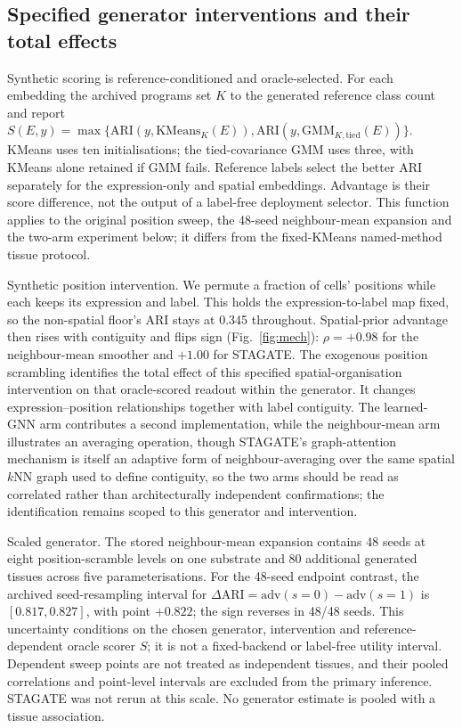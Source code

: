 \documentclass[journal]{IEEEtran}
\begin{document}
\subsection{Specified generator interventions and their total effects}\label{sec:causal}


Synthetic scoring is reference-conditioned and oracle-selected. For each embedding the archived programs set $K$ to the generated reference class count and report $S(E,y)=\max\{\mathrm{ARI}(y,\mathrm{KMeans}_K(E)),\mathrm{ARI}(y,\mathrm{GMM}_{K,\mathrm{tied}}(E))\}$. KMeans uses ten initialisations; the tied-covariance GMM uses three, with KMeans alone retained if GMM fails. Reference labels select the better ARI separately for the expression-only and spatial embeddings. Advantage is their score difference, not the output of a label-free deployment selector. This function applies to the original position sweep, the 48-seed neighbour-mean expansion and the two-arm experiment below; it differs from the fixed-KMeans named-method tissue protocol.

Synthetic position intervention. We permute a fraction of cells'
positions while each keeps its expression and label. This holds the expression-to-label map fixed, so the
non-spatial floor's ARI stays at 0.345 throughout. Spatial-prior advantage then rises with contiguity and
flips sign (Fig.~\ref{fig:mech}): $\rho=+0.98$ for the neighbour-mean smoother and $+1.00$ for STAGATE.
The exogenous position scrambling identifies the total effect of this specified spatial-organisation intervention on that oracle-scored readout within the generator. It changes expression--position relationships together with label contiguity. The learned-GNN arm contributes a second implementation, while the neighbour-mean arm
illustrates an averaging operation, though STAGATE's graph-attention mechanism is itself an adaptive form of
neighbour-averaging over the same spatial $k$NN graph used to define contiguity, so the two arms should be
read as correlated rather than architecturally independent confirmations; the identification remains scoped to this generator and intervention.



Scaled generator. The stored neighbour-mean expansion contains 48 seeds at eight position-scramble levels on one substrate and 80 additional generated tissues across five parameterisations. For the 48-seed endpoint contrast, the archived seed-resampling interval for $\Delta\mathrm{ARI}=\mathrm{adv}(s=0)-\mathrm{adv}(s=1)$ is $[0.817,0.827]$, with point $+0.822$; the sign reverses in 48/48 seeds. This uncertainty conditions on the chosen generator, intervention and reference-dependent oracle scorer $S$; it is not a fixed-backend or label-free utility interval. Dependent sweep points are not treated as independent tissues, and their pooled correlations and point-level intervals are excluded from the primary inference. STAGATE was not rerun at this scale. No generator estimate is pooled with a tissue association.
\end{document}
